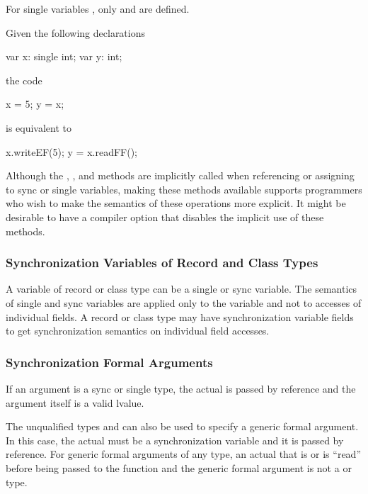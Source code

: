 For single variables ,
only  and  are defined.

\begin{example}
Given the following declarations
\begin{chapel}
var x: single int;
var y: int;
\end{chapel}
the code
\begin{chapel}
x = 5;
y = x;
\end{chapel}
is equivalent to
\begin{chapel}
x.writeEF(5);
y = x.readFF();
\end{chapel}
\end{example}

\begin{rationale}
Although the , , and  methods
are implicitly called
when referencing or assigning to sync or single variables,
making these methods available supports programmers who wish to
make the semantics of these operations more explicit.
It might be desirable to have a compiler option
that disables the implicit use of these methods.
\end{rationale}

\subsubsection{Synchronization Variables of Record and Class Types}
\label{Synchronization_Variables_of_Record_Type}

A variable of record or class type can be a single or sync
variable. The semantics of single and sync variables are applied only
to the variable and not to accesses of individual fields.  A record or
class type may have synchronization variable fields to get
synchronization semantics on individual field accesses.

\subsubsection{Synchronization Formal Arguments}
\label{Synchronization_Formal_Arguments}

If an argument is a sync or single type, the actual is passed by
reference and the argument itself is a valid lvalue.

The unqualified types  and  can also be used
to specify a generic formal argument.  In this case, the actual must
be a synchronization variable and it is passed by reference.  For
generic formal arguments of any type, an actual that is 
or  is ``read'' before being passed to the function and
the generic formal argument is not a  or 
type.

